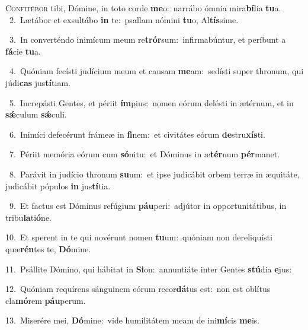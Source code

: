 \lettrine{\initial\textcolor{\initialcolor}{C}}{onfitébor} tibi, Dómine, in toto corde \textbf{me}\-o:~\star narrábo ómnia mira\-\textbf{bí}\-lia \textbf{tu}\-a.\\
{\numbfont\textcolor{\numbcolor}{~2.}}~Lætábor et exsultábo \textbf{in} te:~\star psallam nómini \textbf{tu}\-o, Al\-\textbf{tís}\-sime.\par
{\numbfont\textcolor{\numbcolor}{~3.}}~In converténdo inimícum meum re\-\textbf{trór}\-sum:~\star infirmabúntur, et períbunt a \textbf{fá}\-cie \textbf{tu}\-a.\par
{\numbfont\textcolor{\numbcolor}{~4.}}~Quóniam fecísti judícium meum et causam \textbf{me}\-am:~\star sedísti super thronum, qui júdi\textbf{cas} jus\-\textbf{tí}\-tiam.\par
{\numbfont\textcolor{\numbcolor}{~5.}}~Increpásti Gentes, et périit \textbf{ím}\-pius:~\star nomen eórum delésti in ætérnum, et in \textbf{sǽ}\-culum \textbf{sǽ}\-culi.\par
{\numbfont\textcolor{\numbcolor}{~6.}}~Inimíci defecérunt frámeæ in \textbf{fi}\-nem:~\star et civitátes eórum \textbf{de}\-stru\-\textbf{xís}\-ti.\par
{\numbfont\textcolor{\numbcolor}{~7.}}~Périit memória eórum cum \textbf{só}\-nitu:~\star et Dóminus in æ\-\textbf{tér}\-num \textbf{pér}\-manet.\par
{\numbfont\textcolor{\numbcolor}{~8.}}~Parávit in judício thronum \textbf{su}\-um:~\star et ipse judicábit orbem terræ in æquitáte, judicábit pópulos \textbf{in} jus\-\textbf{tí}\-tia.\par
{\numbfont\textcolor{\numbcolor}{~9.}}~Et factus est Dóminus refúgium \textbf{páu}\-peri:~\star adjútor in opportunitátibus, in tribu\-\textbf{la}\-ti\-\textbf{ó}\-ne.\par
{\numbfont\textcolor{\numbcolor}{10.}}~Et sperent in te qui novérunt nomen \textbf{tu}\-um:~\star quóniam non dereliquísti quæ\-\textbf{rén}\-tes te, \textbf{Dó}\-mine.\par
{\numbfont\textcolor{\numbcolor}{11.}}~Psállite Dómino, qui hábitat in \textbf{Si}\-on:~\star annuntiáte inter Gentes \textbf{stú}\-dia \textbf{e}\-jus:\par
{\numbfont\textcolor{\numbcolor}{12.}}~Quóniam requírens sánguinem eórum recor\-\textbf{dá}\-tus est:~\star non est oblítus cla\-\textbf{mó}\-rem \textbf{páu}\-perum.\par
{\numbfont\textcolor{\numbcolor}{13.}}~Miserére mei, \textbf{Dó}\-mine:~\star vide humilitátem meam de ini\-\textbf{mí}\-cis \textbf{me}\-is.\par

